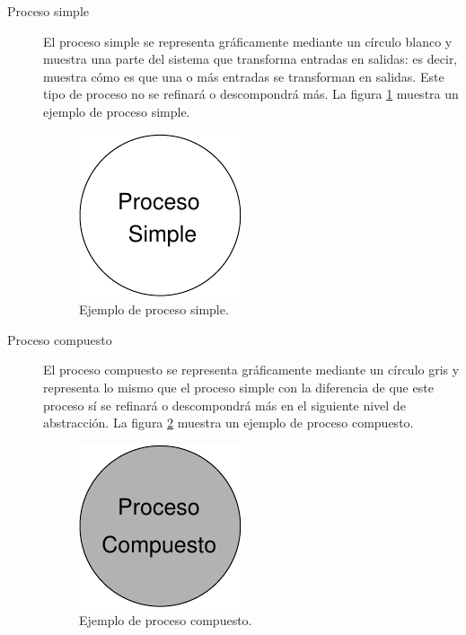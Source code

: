   \begin{description}
   \item[Proceso simple] El proceso simple se representa gráficamente mediante
        un círculo blanco y muestra una parte del sistema que transforma
        entradas en salidas: es decir, muestra cómo es que una o más entradas
        se transforman en salidas. Este tipo de proceso no se refinará o
        descompondrá más. La figura \ref{diagramaProcesoSimple} muestra un
        ejemplo de proceso simple.

        \begin{figure}[!ht]
            \begin{center}
            \includegraphics[]{08.Analisis_Funcional/8.2.DFDs/Diagramas/proceso_simple.pdf}
            \caption{Ejemplo de proceso simple.}
            \label{diagramaProcesoSimple}
            \end{center}
         \end{figure}

   \item[Proceso compuesto] El proceso compuesto se representa gráficamente
        mediante un círculo gris y representa lo mismo que el proceso simple con
        la diferencia de que este proceso sí se refinará o descompondrá más en
        el siguiente nivel de abstracción. La figura
        \ref{diagramaProcesoCompuesto} muestra un ejemplo de proceso compuesto.

        \begin{figure}[!ht]
            \begin{center}
            \includegraphics[]{08.Analisis_Funcional/8.2.DFDs/Diagramas/proceso_compuesto.pdf}
            \caption{Ejemplo de proceso compuesto.}
            \label{diagramaProcesoCompuesto}
            \end{center}
         \end{figure}


\end{description}
